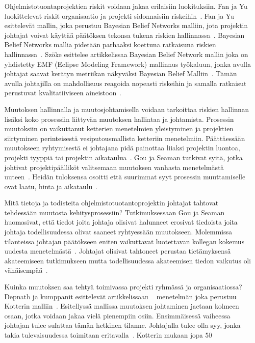 \documentclass[finnish]{tktltiki2}
\theoremstyle{definition}
\theoremstyle{remark}
\begin{document}
Ohjelmistotuontaprojektien riskit voidaan jakaa erilaisiin luokituksiin. Fan ja Yu luokittelevat riskit organisaatio ja projekti sidonnaisiin riskeihin~\cite{fan2004bbn}. Fan ja Yu esittelevät mallin, joka perustuu Bayesian Belief Networks malliin, jota projektin johtajat voivat käyttää päätöksen tekonsa tukena riskien hallinnassa~\cite{fan2004bbn}. Bayesian Belief Networks mallia pidetään parhaaksi koettuna ratkaisuna riskien hallinnassa~\cite{szHokeproject}. Szöke esittelee artikkelissaa Bayesian Belief Network mallin joka on yhdistetty EMF (Eclipse Modeling Framework) mallinnus työkaluun, jonka avulla johtajat saavat kerätyn metriikan näkyväksi Bayesian Belief Malliin~\cite{szHokeproject}. Tämän avulla johtajilla on mahdollisuus reagoida nopeasti riskeihin ja samalla ratkaisut perustuvat kvalitatiiviseen aineistoon~\cite{szHokeproject}.

Muutoksen hallinnalla ja muutosjohtamisella voidaan tarkoittaa riskien hallinnan lisäksi koko prosessiin liittyvän muutoksen hallintaa ja johtamista. Prosessin muutoksiin on vaikuttanut ketterien menetelmien yleistyminen ja projektien siirtyminen perinteisestä vesiputousmallista ketteriin menetelmiin. Päättäessään muutokseen ryhtymisestä ei johtajana pidä painottaa liiaksi projektin luontoa, projekti tyyppiä tai projektin aikataulua~\cite{Chow2008961}. Gou ja Seaman tutkivat syitä, jotka johtivat projektipäälliköt valitsemaan muutoksen vanhasta menetelmästä uuteen~\cite{Guo:2008:SSP:1414004.1414046}. Heidän tuloksensa osoitti että suurimmat syyt prosessin muuttamiselle ovat laatu, hinta ja aikataulu~\cite{Guo:2008:SSP:1414004.1414046}.

Mitä tietoja ja todisteita ohjelmistotuotantoprojektin johtajat tahtovat tehdessään muutosta kehitysprosessiin? Tutkimuksessaan Gou ja Seaman huomasivat, että tiedot joita johtaja olisivat halunneet erosivat tiedoista joita johtaja todellisuudessa olivat saaneet ryhtyessään muutokseen. Molemmissa tilanteissa johtajan päätökseen eniten vaikuttavat luotettavan kollegan kokemus uudesta menetelmästä~\cite{Guo:2008:SSP:1414004.1414046}. Johtajat olisivat tahtoneet perustaa tietämyksensä akateemiseen tutkimukseen mutta todellisuudessa akateemisen tiedon vaikutus oli vähäisempää~\cite{Guo:2008:SSP:1414004.1414046}.

Kuinka muutoksen saa tehtyä toimivassa projekti ryhmässä ja organisaatiossa? Depnath ja kumppanit esittelevät artikkelissaan ~\cite{4017705} menetelmän joka perustuu Kotterin malliin~\cite{kotter1995leading}. Esitellyssä mallissa muutoksen johtaminen jaetaan kolmeen osaan, jotka voidaan jakaa vielä pienempiin osiin. Ensimmäisessä vaiheessa johtajan tulee sulattaa tämän hetkinen tilanne. Johtajalla tulee olla syy, jonka takia tulevaisuudessa toimitaan eritavalla~\cite{4017705}. Kotterin mukaan jopa 50%
\end{document}
